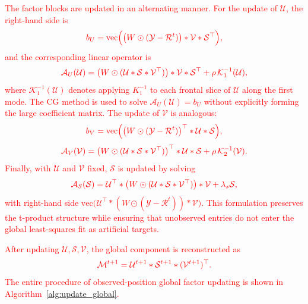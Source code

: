 \documentclass[a4paper,12pt]{article}
\numberwithin{equation}{section}
\numberwithin{algorithm}{section}
\newcommand{\rev}[1]{\textcolor{red}{#1}}
\theoremstyle{remark}
\theoremstyle{definition}
\begin{document}
\rev{The factor blocks are updated in an alternating manner. For the update of $\mathcal{U}$, the right-hand side is}
\begin{equation}
	\rev{b_U=\mathrm{vec}\Big(\big(W\odot(\mathcal{Y}-\mathcal{R}^{t})\big)*\mathcal{V}*\mathcal{S}^{\top}\Big),}
	\label{eq:masked_u_rhs}
\end{equation}
\rev{and the corresponding linear operator is}
\begin{equation}
	\rev{\mathcal{A}_U(\mathcal{U})
	=\big(W\odot(\mathcal{U}*\mathcal{S}*\mathcal{V}^{\top})\big)*\mathcal{V}*\mathcal{S}^{\top}
	+\rho\,\mathcal{K}_1^{-1}(\mathcal{U}),}
	\label{eq:masked_u_operator}
\end{equation}
\rev{where $\mathcal{K}_1^{-1}(\mathcal{U})$ denotes applying $K_1^{-1}$ to each frontal slice of $\mathcal{U}$ along the first mode. The CG method is used to solve $\mathcal{A}_U(\mathcal{U})=b_U$ without explicitly forming the large coefficient matrix. The update of $\mathcal{V}$ is analogous:}
\begin{equation}
	\rev{b_V=\mathrm{vec}\Big(\big(W\odot(\mathcal{Y}-\mathcal{R}^{t})\big)^{\top}*\mathcal{U}*\mathcal{S}\Big),}
	\label{eq:masked_v_rhs}
\end{equation}
\begin{equation}
	\rev{\mathcal{A}_V(\mathcal{V})
	=\big(W\odot(\mathcal{U}*\mathcal{S}*\mathcal{V}^{\top})\big)^{\top}*\mathcal{U}*\mathcal{S}
	+\rho\,\mathcal{K}_2^{-1}(\mathcal{V}).}
	\label{eq:masked_v_operator}
\end{equation}
\rev{Finally, with $\mathcal{U}$ and $\mathcal{V}$ fixed, $\mathcal{S}$ is updated by solving}
\begin{equation}
	\rev{\mathcal{A}_S(\mathcal{S})
	=\mathcal{U}^{\top}*\big(W\odot(\mathcal{U}*\mathcal{S}*\mathcal{V}^{\top})\big)*\mathcal{V}
	+\lambda_s\mathcal{S},}
	\label{eq:masked_s_operator}
\end{equation}
\rev{with right-hand side $\mathrm{vec}\big(\mathcal{U}^{\top}*(W\odot(\mathcal{Y}-\mathcal{R}^{t}))*\mathcal{V}\big)$. This formulation preserves the t-product structure while ensuring that unobserved entries do not enter the global least-squares fit as artificial targets.}

\rev{After updating $\mathcal{U},\mathcal{S},\mathcal{V}$, the global component is reconstructed as}
\begin{equation}
	\rev{\mathcal{M}^{t+1}=\mathcal{U}^{t+1}*\mathcal{S}^{t+1}*(\mathcal{V}^{t+1})^{\top}.}
	\label{eq:M_update_new}
\end{equation}
\rev{The entire procedure of observed-position global factor updating is shown in Algorithm~\ref{alg:update_global}.}
\end{document}
